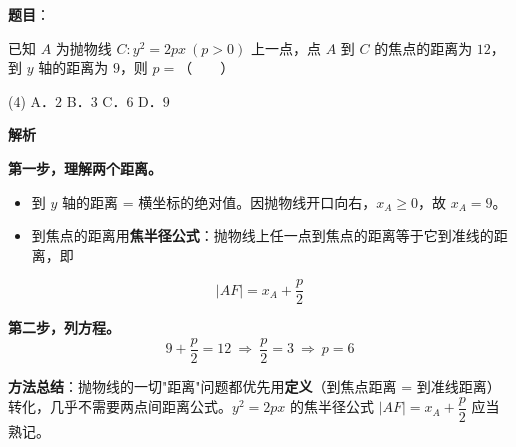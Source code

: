 \begin{answer}

\textbf{题目}：

已知 $A$ 为抛物线 $C:y^{2}=2px\ (p>0)$ 上一点，点 $A$ 到 $C$ 的焦点的距离为 $12$，到 $y$ 轴的距离为 $9$，则 $p=$\mbox{（　　）}

\begin{gkopts}(4)
\task A．$2$
\task B．$3$
\task C．$6$
\task D．$9$
\end{gkopts}

\textbf{解析}

\textbf{第一步，理解两个距离。}

\begin{itemize}
\item 到 $y$ 轴的距离 = 横坐标的绝对值。因抛物线开口向右，$x_A\ge0$，故 $x_A=9$。
\item 到焦点的距离用\textbf{焦半径公式}：抛物线上任一点到焦点的距离等于它到准线的距离，即
\end{itemize}
\nopagebreak[4]
\[|AF|=x_A+\frac p2\]

\textbf{第二步，列方程。}
\nopagebreak[4]
\[9+\frac p2=12\ \Longrightarrow\ \frac p2=3\ \Longrightarrow\ p=6\]

\begin{gktip}
\textbf{方法总结}：抛物线的一切"距离"问题都优先用\textbf{定义}（到焦点距离 = 到准线距离）转化，几乎不需要两点间距离公式。$y^2=2px$ 的焦半径公式 $|AF|=x_A+\dfrac p2$ 应当熟记。
\end{gktip}


\par\medskip

\end{answer}
